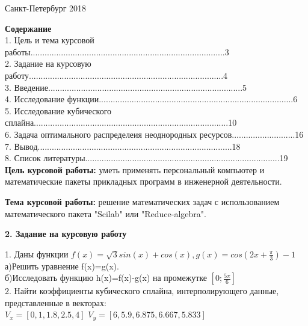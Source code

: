 \documentclass[russian,utf8,nocolumxxxi,nocolumnxxxii]{eskdtext}
\begin{document}
\hfill \break
\hfill \break
\begin{center} Санкт-Петербург 2018 \end{center}
\thispagestyle{empty} %
\newpage
\normalsize{\bf{Содержание}}
\\1. Цель и тема курсовой работы...................................................................................3
\\2. Задание на курсовую работу...................................................................................4
\\3. Введение...................................................................................5
\\4. Исследование функции...................................................................................6
\\5. Исследование кубического сплайна...................................................................................10
\\6. Задача оптимального распределеия неоднородных ресурсов...........................16
\\7. Вывод...................................................................................18
\\8. Список литературы...................................................................................19
\newpage
\normalsize{\bf{Цель курсовой работы:}} уметь применять персональный компьютер и
математические пакеты прикладных программ в инженерной деятельности.
\par
\normalsize{\bf{Тема курсовой работы:}} решение математических задач с использованием
математического пакета "Scilab" или "Reduce-algebra".
\newpage
\begin{center} 
 {\large\bf2. Задание на курсовую работу}
 \end{center}
 \normalsize1. Даны функции $f(x)=\sqrt{3}sin(x)+cos(x),g(x)=cos(2x+\frac{\pi}{3})-1$
\\а)Решить уравнение f(x)=g(x).
\\б)Исследовать функцию h(x)=f(x)-g(x) на промежутке $[0;\frac{5\pi}{6}]$
\\2. Найти коэффициенты кубического сплайна, интерполирующего данные, представленные в векторах:\\
$V_{x}=[0,1,1.8,2.5,4]$
$V_{y}=[6,5.9,6.875,6.667,5.833]$\\
\end{document}
